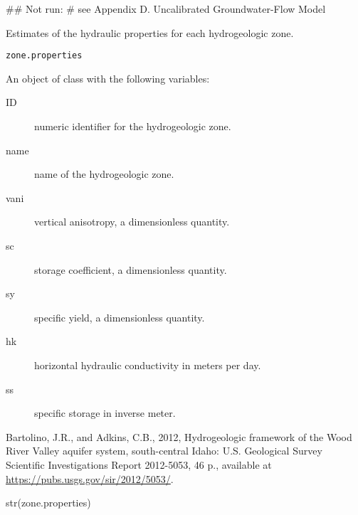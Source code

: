 \documentclass[a4paper]{book}
\begin{document}
%
\begin{Examples}
\begin{ExampleCode}
## Not run: # see Appendix D. Uncalibrated Groundwater-Flow Model

\end{ExampleCode}
\end{Examples}
%
\begin{Description}\relax
Estimates of the hydraulic properties for each hydrogeologic zone.
\end{Description}
%
\begin{Usage}
\begin{verbatim}
zone.properties
\end{verbatim}
\end{Usage}
%
\begin{Format}
An object of  class with the following variables:
\begin{description}

\item[ID] numeric identifier for the hydrogeologic zone.
\item[name] name of the hydrogeologic zone.
\item[vani] vertical anisotropy, a dimensionless quantity.
\item[sc] storage coefficient, a dimensionless quantity.
\item[sy] specific yield, a dimensionless quantity.
\item[hk] horizontal hydraulic conductivity in meters per day.
\item[ss] specific storage in inverse meter.

\end{description}

\end{Format}
%
\begin{References}\relax
Bartolino, J.R., and Adkins, C.B., 2012, Hydrogeologic framework of the
Wood River Valley aquifer system, south-central Idaho:
U.S. Geological Survey Scientific Investigations Report 2012-5053, 46 p.,
available at \url{https://pubs.usgs.gov/sir/2012/5053/}.
\end{References}
%
\begin{Examples}
\begin{ExampleCode}
str(zone.properties)

\end{ExampleCode}
\end{Examples}
\printindex{}
\end{document}
